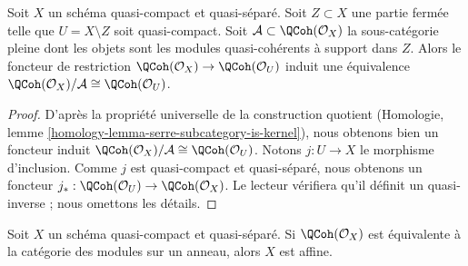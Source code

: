 \begin{lemma}
\label{lemma-quotient-supported-on-closed}
Soit $X$ un schéma quasi-compact et quasi-séparé.
Soit $Z \subset X$ une partie fermée telle que $U = X \setminus Z$
soit quasi-compact. Soit $\mathcal{A} \subset \QCoh(\mathcal{O}_X)$
la sous-catégorie pleine dont les objets sont les modules quasi-cohérents
à support dans $Z$. Alors le foncteur de restriction
$\QCoh(\mathcal{O}_X) \to \QCoh(\mathcal{O}_U)$ induit
une équivalence $\QCoh(\mathcal{O}_X)/\mathcal{A} \cong \QCoh(\mathcal{O}_U)$.
\end{lemma}

\begin{proof}
D'après la propriété universelle de la construction quotient
(Homologie, lemme \ref{homology-lemma-serre-subcategory-is-kernel}),
nous obtenons bien un foncteur induit
$\QCoh(\mathcal{O}_X)/\mathcal{A} \cong \QCoh(\mathcal{O}_U)$.
Notons $j : U \to X$ le morphisme d'inclusion. Comme $j$ est quasi-compact
et quasi-séparé, nous obtenons un foncteur
$j_* : \QCoh(\mathcal{O}_U) \to \QCoh(\mathcal{O}_X)$.
Le lecteur vérifiera qu'il définit un quasi-inverse ; nous omettons les détails.
\end{proof}

\begin{lemma}
\label{lemma-characterize-affine}
Soit $X$ un schéma quasi-compact et quasi-séparé.
Si $\QCoh(\mathcal{O}_X)$ est équivalente à la catégorie des modules
sur un anneau, alors $X$ est affine.
\end{lemma}

